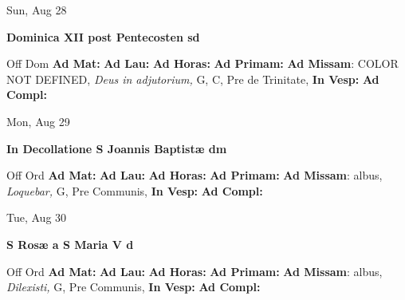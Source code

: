 \documentclass[10pt]{memoir}
\begin{document}
\begin{center}
\begin{minipage}{3.5in}
\vspace{2em}
\begin{center}Sun, Aug 28
\end{center}
\textbf{ \large Dominica XII post Pentecosten
\textnormal{\normalsize sd}}

\begin{justify}Off Dom
\textbf{Ad Mat: }
\textbf{Ad Lau: }
\textbf{Ad Horas: }
\textbf{Ad Primam: }\textbf{Ad Missam}: COLOR NOT DEFINED, \textit{Deus in adjutorium,} G, C, Pre de Trinitate, 
\textbf{In Vesp: }
\textbf{Ad Compl: }
\end{justify}
\end{minipage}
\end{center}

\begin{center}
\begin{minipage}{3.5in}
\vspace{2em}
\begin{center}Mon, Aug 29
\end{center}
\textbf{ \large In Decollatione S Joannis Baptistæ
\textnormal{\normalsize dm}}

\begin{justify}Off Ord
\textbf{Ad Mat: }
\textbf{Ad Lau: }
\textbf{Ad Horas: }
\textbf{Ad Primam: }\textbf{Ad Missam}: albus, \textit{Loquebar,} G, Pre Communis, 
\textbf{In Vesp: }
\textbf{Ad Compl: }
\end{justify}
\end{minipage}
\end{center}

\begin{center}
\begin{minipage}{3.5in}
\vspace{2em}
\begin{center}Tue, Aug 30
\end{center}
\textbf{ \large S Rosæ a S Maria V
\textnormal{\normalsize d}}

\begin{justify}Off Ord
\textbf{Ad Mat: }
\textbf{Ad Lau: }
\textbf{Ad Horas: }
\textbf{Ad Primam: }\textbf{Ad Missam}: albus, \textit{Dilexisti,} G, Pre Communis, 
\textbf{In Vesp: }
\textbf{Ad Compl: }
\end{justify}
\end{minipage}
\end{center}
\end{document}
